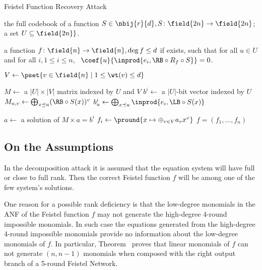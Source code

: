 \begin{algorithm}
    \caption{Feistel Function Recovery Attack}
    
    \begin{algorithmic}[1]
        \Require the full codebook of a function $S \in \nbij{r}{d}, S\colon \field{2n} \to \field{2n}$; a set $U \subseteq \field{2n}\}$.
        
        \Ensure a function $f\colon \field{n} \to \field{n}, \deg{f} \le d$ if exists, such that 
        \Statex for all $u \in U$ and for all $i,1 \le i \le n$,~ $\coef{u}{\inprod{e_i, \RB \circ R_f \circ S}} = 0$.
        
        \State $V \gets \pset{v \in \field{n} \mid 1 \le \wt(v) \le d}$
        
        \State $M \gets$ a $|U|\times|V|$ matrix indexed by $U$ and $V$
            \State $b^i \gets$ a $|U|$-bit vector indexed by $U$
        \EndFor
                \State $M_{u,v} \gets \bigoplus_{x \preceq u}
                    (\RB \circ S(x))^v$
            \EndFor
                \State $b^i_u \gets \bigoplus_{x \preceq u} \inprod{e_i, \LB \circ S(x)}$
            \EndFor
        \EndFor

            \State $a \gets$ a solution of $M\times a = b^i$
            \State $f_i \gets \pround{x \mapsto \oplus_{v \in V} a_v x^v}$
        \EndFor
        \State \Return $f = (f_1, \ldots, f_n)$
    \end{algorithmic}
\end{algorithm}


\subsection{On the Assumptions}

In the decomposition attack it is assumed that the equation system will have full or close to full rank. Then the correct Feistel function $f$ will be among one of the few system's solutions.

One reason for a possible rank deficiency is that the low-degree monomials in the ANF of the Feistel function $f$ may not generate the high-degree 4-round impossible monomials. In such case the equations generated from the high-degree 4-round impossible monomials provide no information about the low-degree monomials of $f$. In particular, Theorem~ proves that linear monomials of $f$ can not generate $(n,n-1)$ monomials when composed with the right output branch of a 5-round Feistel Network.

